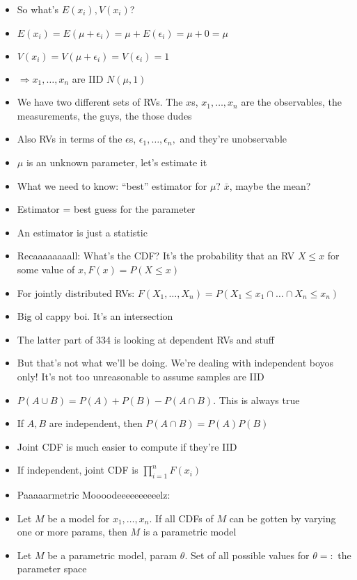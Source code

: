 \documentclass{article}
\begin{document}
\begin{itemize}
    \item So what's  $ E(x_i), V(x_i) $?
    \item  $ E(x_i) = E(\mu + \epsilon_i) = \mu + E(\epsilon_i) = \mu + 0 = \mu $
    \item  $ V(x_i) = V(\mu + \epsilon_i) = V(\epsilon_i) = 1 $
    \item  $ \Rightarrow x_1, \ldots, x_n $  are IID $ N(\mu, 1) $
    \item We have two different sets of RVs. The  $ x $s,  $ x_1, \ldots, x_n $ are the observables, the measurements, the guys, the those dudes
    \item Also RVs in terms of the $ \epsilon $s,  $ \epsilon_1, \ldots, \epsilon_n, $ and they're unobservable
    \item $ \mu $ is an unknown parameter, let's estimate it
    \item What we need to know:  ``best'' estimator for $ \mu $?  $ \bar{x} $, maybe the mean?
    \item Estimator = best guess for the parameter
    \item An estimator is just a statistic
    \item Recaaaaaaaall: What's the CDF\@? It's the probability that an RV  $ X \leq x $ for some value of $ x, F(x) = P(X \leq x) $
    \item For jointly distributed RVs: $ F(X_1, \ldots, X_n) = P(X_1 \leq x_1 \cap \ldots \cap X_n \leq x_n) $
    \item Big ol cappy boi. It's an intersection
    \item The latter part of 334 is looking at dependent RVs and stuff
    \item But that's not what we'll be doing. We're dealing with independent boyos only! It's not too unreasonable to assume samples are IID
    \item $ P(A \cup B) = P(A) + P(B) - P(A \cap B) $. This is always true
    \item If $ A, B $ are independent, then  $ P(A \cap B) = P(A) P(B) $
    \item Joint  CDF is much easier to compute if they're IID 
    \item If independent, joint CDF is $  \prod_{i = 1}^{n} F(x_i) $
    \item Paaaaarmetric Moooodeeeeeeeeeelz:
    \item Let $ M $ be a model for  $ x_1, \ldots, x_n $. If all CDFs of $ M $ can be gotten by varying one or more params, then  $ M $ is a parametric model
    \item Let  $ M $ be a parametric model, param  $ \theta $. Set of all possible values for  $ \theta =: $ the parameter space

\end{itemize}
\end{document}
